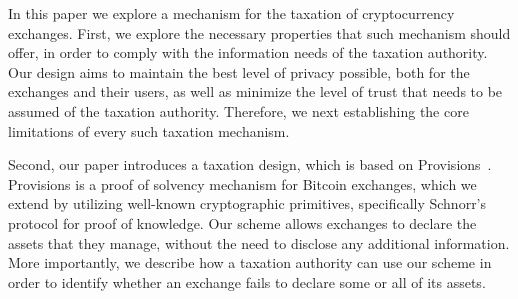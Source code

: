In this paper we explore a mechanism for the taxation of cryptocurrency
exchanges. First, we explore the necessary properties that such mechanism
should offer, in order to comply with the information needs of the taxation
authority. Our design aims to maintain the best level of privacy possible, both
for the exchanges and their users, as well as minimize the level of trust that
needs to be assumed of the taxation authority. Therefore, we next establishing
the core limitations of every such taxation mechanism.

Second, our paper introduces a taxation design, which is based on
Provisions~\cite{CCS:DBBCB15}. Provisions is a proof of solvency mechanism for
Bitcoin exchanges, which we extend by utilizing well-known cryptographic
primitives, specifically Schnorr's protocol for proof of knowledge. Our scheme
allows exchanges to declare the assets that they manage, without the need to
disclose any additional information. More importantly, we describe how a
taxation authority can use our scheme in order to identify whether an exchange
fails to declare some or all of its assets.
%
